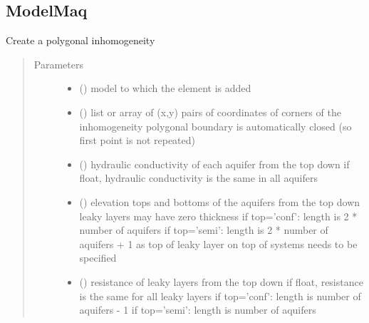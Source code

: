 \documentclass[letterpaper,10pt,english]{sphinxmanual}
\begin{document}
\subsection{ModelMaq}
\label{\detokenize{inhoms/polygoninhommaq:modelmaq}}\label{\detokenize{inhoms/polygoninhommaq::doc}}

\begin{fulllineitems}
\label{\detokenize{inhoms/polygoninhommaq:timml.inhomogeneity.PolygonInhomMaq}}
Create a polygonal inhomogeneity
\begin{quote}\begin{description}
\item[{Parameters}] \leavevmode\begin{itemize}
\item {} 
 () \textendash{} model to which the element is added

\item {} 
 () \textendash{} list or array of (x,y) pairs of coordinates of corners of the
inhomogeneity
polygonal boundary is automatically closed (so first point
is not repeated)

\item {} 
 (\sphinxstyleliteralemphasis{, }) \textendash{} hydraulic conductivity of each aquifer from the top down
if float, hydraulic conductivity is the same in all aquifers

\item {} 
 () \textendash{} elevation tops and bottoms of the aquifers from the top down
leaky layers may have zero thickness
if top=’conf’: length is 2 * number of aquifers
if top=’semi’: length is 2 * number of aquifers + 1 as top
of leaky layer on top of systems needs to be specified

\item {} 
 (\sphinxstyleliteralemphasis{, }) \textendash{} resistance of leaky layers from the top down
if float, resistance is the same for all leaky layers
if top=’conf’: length is number of aquifers - 1
if top=’semi’: length is number of aquifers


\end{itemize}
\end{description}
\end{quote}
\end{fulllineitems}
\end{document}

